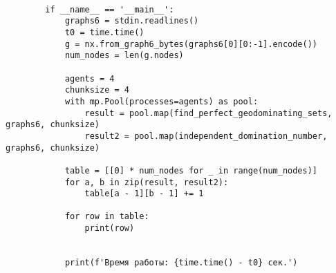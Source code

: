 \documentclass[bachelor, och, nir]{SCWorks}
\begin{document}
\begin{verbatim}
        
        if __name__ == '__main__':
            graphs6 = stdin.readlines()
            t0 = time.time()
            g = nx.from_graph6_bytes(graphs6[0][0:-1].encode())
            num_nodes = len(g.nodes)
        
            agents = 4
            chunksize = 4
            with mp.Pool(processes=agents) as pool:
                result = pool.map(find_perfect_geodominating_sets, graphs6, chunksize)
                result2 = pool.map(independent_domination_number, graphs6, chunksize)
        
            table = [[0] * num_nodes for _ in range(num_nodes)]
            for a, b in zip(result, result2):
                table[a - 1][b - 1] += 1
        
            for row in table:
                print(row)
        
        
            print(f'Время работы: {time.time() - t0} сек.')
        
    \end{verbatim}
\end{document}
